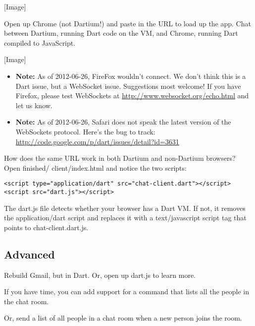[Image]

Open up Chrome (not Dartium!) and paste in the URL to load up the app. Chat between Dartium, running Dart code on the VM, and Chrome, running Dart compiled to JavaScript.

[Image]

\begin{itemize}
\item {\bf Note:} As of 2012-06-26, FireFox wouldn’t connect. We don’t think this is a Dart issue, but a WebSocket issue. Suggestions most welcome! If you have Firefox, please test WebSockets at \url{http://www.websocket.org/echo.html} and let us know.
\item {\bf Note:} As of 2012-06-26, Safari does not speak the latest version of the WebSockets protocol. Here’s the bug to track: \url{http://code.google.com/p/dart/issues/detail?id=3631}
\end{itemize}

How does the same URL work in both Dartium and non-Dartium browsers? Open finished/ client/index.html and notice the two scripts:

\begin{verbatim}
<script type="application/dart" src="chat-client.dart"></script>
<script src="dart.js"></script>
\end{verbatim}

The dart.js file detects whether your browser has a Dart VM. If not, it removes the application/dart script and replaces it with a text/javascript script tag that points to chat-client.dart.js.

\subsection{Advanced}

Rebuild Gmail, but in Dart. Or, open up dart.js to learn more.

If you have time, you can add support for a command that lists all the people in the chat room.

Or, send a list of all people in a chat room when a new person joins the room.

